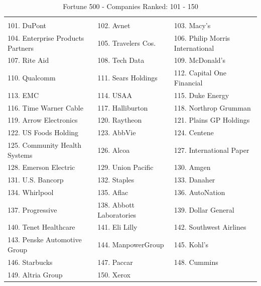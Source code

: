 \documentclass{book}
\begin{document}
\begin{table}[H]
\centering
\caption{Fortune 500 - Companies Ranked: 101 - 150}
\begin{tabular}{lll}
\hline
 \\ 101. DuPont 
&  102. Avnet 
&  103. Macy's 
\\ 104. Enterprise Products Partners 
&  105. Travelers Cos. 
&  106. Philip Morris International 
\\ 107. Rite Aid 
&  108. Tech Data 
&  109. McDonald's 
\\ 110. Qualcomm 
&  111. Sears Holdings 
&  112. Capital One Financial 
\\ 113. EMC 
&  114. USAA 
&  115. Duke Energy 
\\ 116. Time Warner Cable 
&  117. Halliburton 
&  118. Northrop Grumman 
\\ 119. Arrow Electronics 
&  120. Raytheon 
&  121. Plains GP Holdings 
\\ 122. US Foods Holding 
&  123. AbbVie 
&  124. Centene 
\\ 125. Community Health Systems 
&  126. Alcoa 
&  127. International Paper 
\\ 128. Emerson Electric 
&  129. Union Pacific 
&  130. Amgen 
\\ 131. U.S. Bancorp 
&  132. Staples 
&  133. Danaher 
\\ 134. Whirlpool 
&  135. Aflac 
&  136. AutoNation 
\\ 137. Progressive 
&  138. Abbott Laboratories 
&  139. Dollar General 
\\ 140. Tenet Healthcare 
&  141. Eli Lilly 
&  142. Southwest Airlines 
\\ 143. Penske Automotive Group 
&  144. ManpowerGroup 
&  145. Kohl's 
\\ 146. Starbucks 
&  147. Paccar 
&  148. Cummins 
\\ 149. Altria Group 
&  150. Xerox 
 &
 \\ \hline

\end{tabular}
\end{table}
\end{document}
